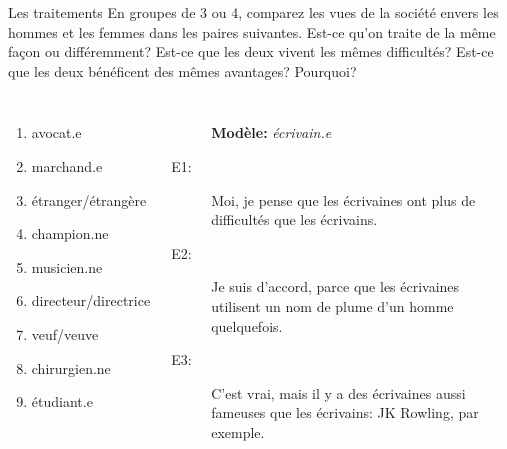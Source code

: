 \begin{frame}{Les traitements}
  \small
  En groupes de 3 ou 4, comparez les vues de la société envers les hommes et les femmes dans les paires suivantes.
  Est-ce qu'on traite de la même façon ou différemment?
  Est-ce que les deux vivent  les mêmes difficultés?
  Est-ce que les deux bénéficent des mêmes avantages?
  Pourquoi?
  \begin{columns}
    \small
      \begin{enumerate}
        \item avocat.e
        \item marchand.e
        \item étranger/étrangère
        \item champion.ne
        \item musicien.ne
        \item directeur/directrice
        \item veuf/veuve
        \item chirurgien.ne
        \item étudiant.e
      \end{enumerate}
      \begin{description}
        \item[] \textbf{Modèle:} \emph{écrivain.e}
        \item[E1:] Moi, je pense que les écrivaines ont plus de difficultés que les écrivains.
        \item[E2:] Je suis d'accord, parce que les écrivaines utilisent un nom de plume d'un homme quelquefois.
        \item[E3:] C'est vrai, mais il y a des écrivaines aussi fameuses que les écrivains: JK Rowling, par exemple.
      \end{description}
  \end{columns}
\end{frame}